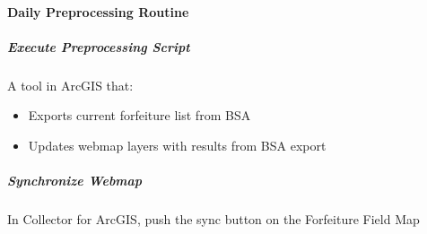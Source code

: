 \documentclass[class=article , crop=false, titlepage, twoside, multi={itemize, figure, verbatim}, float=false]{standalone}
\begin{document}
\paragraph{Daily Preprocessing Routine}

\subparagraph{Execute Preprocessing Script}A tool in ArcGIS that:

\begin{itemize}

\item Exports current forfeiture list from BSA
\item Updates webmap layers with results from BSA export


\end{itemize}

\subparagraph{Synchronize Webmap}In Collector for ArcGIS, push the sync button on the Forfeiture Field Map 
\newpage
\end{document}
